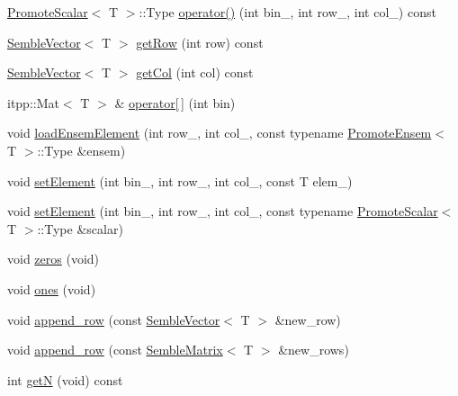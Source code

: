 \begin{DoxyCompactItemize}
\item 
\mbox{\hyperlink{structSEMBLE_1_1PromoteScalar}{Promote\+Scalar}}$<$ T $>$\+::Type \mbox{\hyperlink{structSEMBLE_1_1SembleMatrix_a8c7221108aa9bee53e6261599685944b}{operator()}} (int bin\+\_\+, int row\+\_\+, int col\+\_\+) const
\item 
\mbox{\hyperlink{structSEMBLE_1_1SembleVector}{Semble\+Vector}}$<$ T $>$ \mbox{\hyperlink{structSEMBLE_1_1SembleMatrix_ad95bd96d7ebe3ece4ec35a3db8e3d517}{get\+Row}} (int row) const
\item 
\mbox{\hyperlink{structSEMBLE_1_1SembleVector}{Semble\+Vector}}$<$ T $>$ \mbox{\hyperlink{structSEMBLE_1_1SembleMatrix_ac90d6f868b9a3731eadb99891c078149}{get\+Col}} (int col) const
\item 
itpp\+::\+Mat$<$ T $>$ \& \mbox{\hyperlink{structSEMBLE_1_1SembleMatrix_ae3f8a4a0618707cf388b9815f9f4b197}{operator\mbox{[}$\,$\mbox{]}}} (int bin)
\item 
void \mbox{\hyperlink{structSEMBLE_1_1SembleMatrix_a84fd4f9ffc4012e6e09faa054ed57908}{load\+Ensem\+Element}} (int row\+\_\+, int col\+\_\+, const typename \mbox{\hyperlink{structSEMBLE_1_1PromoteEnsem}{Promote\+Ensem}}$<$ T $>$\+::Type \&ensem)
\item 
void \mbox{\hyperlink{structSEMBLE_1_1SembleMatrix_a1b68e0d33a0d6699d94590135e3f4163}{set\+Element}} (int bin\+\_\+, int row\+\_\+, int col\+\_\+, const T elem\+\_\+)
\item 
void \mbox{\hyperlink{structSEMBLE_1_1SembleMatrix_a5840aaaabbade4c2714f3bfd99d150a8}{set\+Element}} (int bin\+\_\+, int row\+\_\+, int col\+\_\+, const typename \mbox{\hyperlink{structSEMBLE_1_1PromoteScalar}{Promote\+Scalar}}$<$ T $>$\+::Type \&scalar)
\item 
void \mbox{\hyperlink{structSEMBLE_1_1SembleMatrix_a1b6d5a9a3816e9d98eb55a71a5fa1a5f}{zeros}} (void)
\item 
void \mbox{\hyperlink{structSEMBLE_1_1SembleMatrix_aef0a3843776f6b716f466616c10b1cd2}{ones}} (void)
\item 
void \mbox{\hyperlink{structSEMBLE_1_1SembleMatrix_a7553dc6264308f6f0755e46ed49c3df4}{append\+\_\+row}} (const \mbox{\hyperlink{structSEMBLE_1_1SembleVector}{Semble\+Vector}}$<$ T $>$ \&new\+\_\+row)
\item 
void \mbox{\hyperlink{structSEMBLE_1_1SembleMatrix_a823a02fc92f954965ca57bd5cbe72cfe}{append\+\_\+row}} (const \mbox{\hyperlink{structSEMBLE_1_1SembleMatrix}{Semble\+Matrix}}$<$ T $>$ \&new\+\_\+rows)
\item 
int \mbox{\hyperlink{structSEMBLE_1_1SembleMatrix_a08e062d74d9de22f303e1ab957eb77f2}{getN}} (void) const

\end{DoxyCompactItemize}
